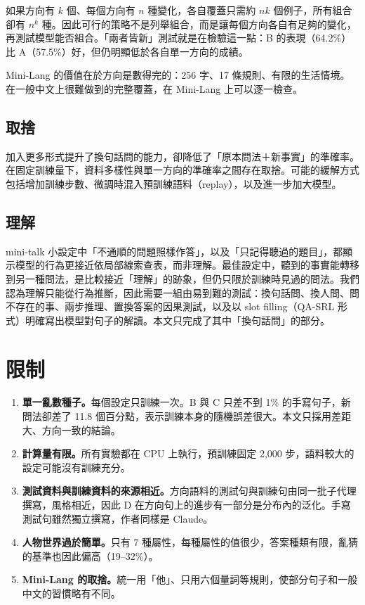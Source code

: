 \documentclass[11pt,a4paper]{article}
\begin{document}
如果方向有 $k$ 個、每個方向有 $n$ 種變化，各自覆蓋只需約 $nk$ 個例子，所有組合卻有 $n^k$ 種。因此可行的策略不是列舉組合，而是讓每個方向各自有足夠的變化，再測試模型能否組合。「兩者皆新」測試就是在檢驗這一點：B 的表現（64.2\%）比 A（57.5\%）好，但仍明顯低於各自單一方向的成績。

Mini-Lang 的價值在於方向是數得完的：256 字、17 條規則、有限的生活情境。在一般中文上很難做到的完整覆蓋，在 Mini-Lang 上可以逐一檢查。

\subsection{取捨}

加入更多形式提升了換句話問的能力，卻降低了「原本問法＋新事實」的準確率。在固定訓練量下，資料多樣性與單一方向的準確率之間存在取捨。可能的緩解方式包括增加訓練步數、微調時混入預訓練語料（replay），以及進一步加大模型。

\subsection{理解}

mini-talk 小設定中「不通順的問題照樣作答」，以及「只記得聽過的題目」，都顯示模型的行為更接近依局部線索查表，而非理解。最佳設定中，聽到的事實能轉移到另一種問法，是比較接近「理解」的跡象，但仍只限於訓練時見過的問法。我們認為理解只能從行為推斷，因此需要一組由易到難的測試：換句話問、換人問、問不存在的事、兩步推理、置換答案的因果測試，以及以 slot filling（QA-SRL \cite{he2015qasrl} 形式）明確寫出模型對句子的解讀。本文只完成了其中「換句話問」的部分。

\section{限制}

\begin{enumerate}
  \item \textbf{單一亂數種子。}每個設定只訓練一次。B 與 C 只差不到 1\% 的手寫句子，新問法卻差了 11.8 個百分點，表示訓練本身的隨機誤差很大。本文只採用差距大、方向一致的結論。
  \item \textbf{計算量有限。}所有實驗都在 CPU 上執行，預訓練固定 2,000 步，語料較大的設定可能沒有訓練充分。
  \item \textbf{測試資料與訓練資料的來源相近。}方向語料的測試句與訓練句由同一批子代理撰寫，風格相近，因此 D 在方向句上的進步有一部分是分布內的泛化。手寫測試句雖然獨立撰寫，作者同樣是 Claude。
  \item \textbf{人物世界過於簡單。}只有 7 種屬性，每種屬性的值很少，答案種類有限，亂猜的基準也因此偏高（19--32\%）。
  \item \textbf{Mini-Lang 的取捨。}統一用「他」、只用六個量詞等規則，使部分句子和一般中文的習慣略有不同。
\end{enumerate}
\end{document}
